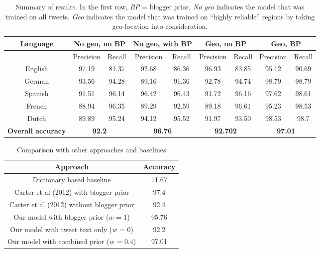 \documentclass[11pt]{article}
\begin{document}
\begin{table}
\begin{center}
\small
\begin{tabular}{|c||c|c||c|c||c|c||c|c|}
\hline
\textbf{Language} & \multicolumn{2}{|c||}{\textbf {No geo, no BP}} & \multicolumn{2}{|c||}{\textbf{No geo, with BP}} & \multicolumn{2}{|c||}{\textbf{Geo, no BP}} & \multicolumn{2}{|c|}{\textbf{Geo, BP}} \\
\hline
 & Precision & Recall & Precision & Recall & Precision & Recall & Precision & Recall \\
\hline
English   & 97.19 & 81.37 & 92.68 & 86.36 & 96.93 & 83.85 & 95.12 & 90.69 \\
German    & 93.56 & 94.28 & 89.16 & 91.36 & 92.78 & 94.74 & 98.79 & 98.79 \\
Spanish   & 91.51 & 96.14 & 96.42 & 96.43 & 91.72 & 96.16 & 97.62 & 98.61 \\
French    & 88.94 & 96.35 & 89.29 & 92.59 & 89.18 & 96.61 & 95.23 & 98.53 \\
Dutch     & 89.89 & 95.24 & 94.12 & 95.52 & 91.97 & 93.50 & 98.53 & 98.7 \\
\hline
\textbf{Overall accuracy} & \multicolumn{2}{|c||}{\textbf{92.2}} & \multicolumn{2}{|c||}{\textbf{96.76}} & \multicolumn{2}{|c||}{\textbf{92.702}} & \multicolumn{2}{|c|}{\textbf{97.01}} \\
\hline
\end{tabular}
\caption{\footnotesize Summary of results. In the first row, \emph{BP} = blogger prior, \emph{No geo} indicates the model that was trained on all tweets, \emph{Geo} indicates the model that was trained on ``highly reliable'' regions by taking geo-location into consideration. }
\end{center}
\end{table}

\begin{table}
\begin{center}
\small
\begin{tabular}{|c|c|}
\hline
\textbf{Approach} & \textbf{Accuracy} \\
\hline
Dictionary based baseline                 & 71.67 \\
Carter et al (2012) with blogger prior    & 97.4 \\
Carter et al (2012) without blogger prior & 92.4 \\
Our model with blogger prior ($w$ = 1)    & 95.76 \\
Our model with tweet text only ($w$ = 0)  & 92.2 \\
Our model with combined prior ($w$ = 0.4) & 97.01 \\

\hline
\end{tabular}
\caption{\footnotesize Comparison with other approaches and baselines}
\end{center}
\end{table}
\end{document}
